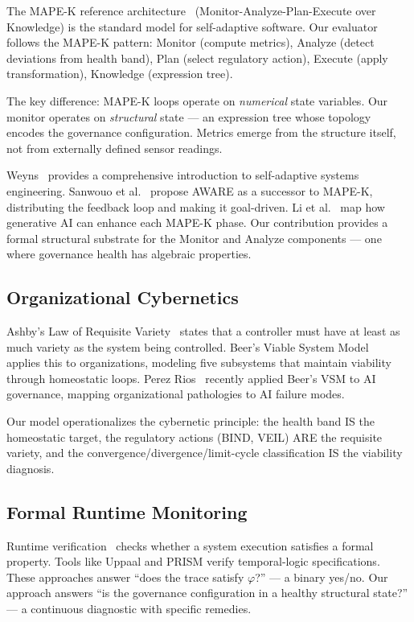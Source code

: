 \documentclass[sigconf,nonacm]{acmart}
\begin{document}
The MAPE-K reference architecture~\cite{mapek} (Monitor-Analyze-Plan-Execute
over Knowledge) is the standard model for self-adaptive software. Our
evaluator follows the MAPE-K pattern: Monitor (compute metrics), Analyze
(detect deviations from health band), Plan (select regulatory action),
Execute (apply transformation), Knowledge (expression tree).

The key difference: MAPE-K loops operate on \emph{numerical} state
variables. Our monitor operates on \emph{structural} state --- an
expression tree whose topology encodes the governance configuration.
Metrics emerge from the structure itself, not from externally defined
sensor readings.

Weyns~\cite{weyns} provides a comprehensive introduction to self-adaptive
systems engineering. Sanwouo et al.~\cite{aware} propose AWARE as a
successor to MAPE-K, distributing the feedback loop and making it
goal-driven. Li et al.~\cite{ligen} map how generative AI can enhance
each MAPE-K phase. Our contribution provides a formal structural substrate
for the Monitor and Analyze components --- one where governance health has
algebraic properties.

\subsection{Organizational Cybernetics}

Ashby's Law of Requisite Variety~\cite{ashby} states that a controller
must have at least as much variety as the system being controlled. Beer's
Viable System Model~\cite{beer} applies this to organizations, modeling
five subsystems that maintain viability through homeostatic loops. Perez
Rios~\cite{perezrios} recently applied Beer's VSM to AI governance,
mapping organizational pathologies to AI failure modes.

Our model operationalizes the cybernetic principle: the health band IS the
homeostatic target, the regulatory actions (BIND, VEIL) ARE the requisite
variety, and the convergence/divergence/limit-cycle classification IS the
viability diagnosis.

\subsection{Formal Runtime Monitoring}

Runtime verification~\cite{leucker} checks whether a system execution
satisfies a formal property. Tools like Uppaal and PRISM verify
temporal-logic specifications. These approaches answer ``does the trace
satisfy $\varphi$?'' --- a binary yes/no. Our approach answers ``is the
governance configuration in a healthy structural state?'' --- a continuous
diagnostic with specific remedies.
\end{document}
